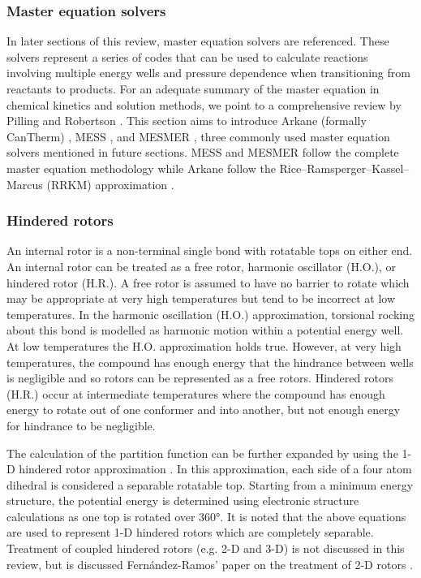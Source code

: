 \documentclass[preprint, 11pt]{elsarticle} %
\begin{document}
\subsubsection{Master equation solvers}

In later sections of this review, master equation solvers are referenced.
These solvers represent a series of codes that can be used to calculate reactions involving multiple energy wells and pressure dependence when transitioning from reactants to products.
For an adequate summary of the master equation in chemical kinetics and solution methods, we point to a comprehensive review by Pilling and Robertson \cite{Pilling:2003}.
This section aims to introduce Arkane (formally CanTherm) \cite{gao:2016}, MESS \cite{MESS:2013}, and MESMER \cite{MESMER:2012}, three commonly used master equation solvers mentioned in future sections. 
MESS and MESMER follow the complete master equation methodology while Arkane follow the Rice–Ramsperger–Kassel–Marcus (RRKM) approximation \cite{RRKM:1999}. 


\subsubsection{Hindered rotors}

An internal rotor is a non-terminal single bond with rotatable tops on either end. 
An internal rotor can be treated as a free rotor, harmonic oscillator (H.O.), or hindered rotor (H.R.).
A free rotor is assumed to have no barrier to rotate which may be appropriate at very high temperatures but tend to be incorrect at low temperatures.
In the harmonic oscillation (H.O.) approximation, torsional rocking about this bond is modelled as harmonic motion within a potential energy well.
At low temperatures the H.O. approximation holds true. 
However, at very high temperatures, the compound has enough energy that the hindrance between wells is negligible and so rotors can be represented as a free rotors. 
Hindered rotors (H.R.) occur at intermediate temperatures where the compound has enough energy to rotate out of one conformer and into another, but not enough energy for hindrance to be negligible.

The calculation of the partition function can be further expanded by using the 1-D hindered rotor approximation \cite{pfaendtner:2007}.
In this approximation, each side of a four atom dihedral is considered a separable rotatable top.
Starting from a minimum energy structure, the potential energy is determined using electronic structure calculations as one top is rotated over \ang{360}. 
It is noted that the above equations are used to represent 1-D hindered rotors which are completely separable.
Treatment of coupled hindered rotors (e.g. 2-D and 3-D) is not discussed in this review, but is discussed Fern\'andez-Ramos' paper on the treatment of 2-D rotors \cite{fernandez:2013}.
\end{document}
